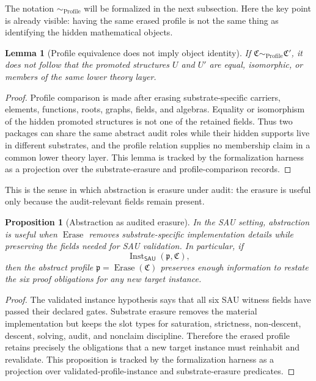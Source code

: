 \documentclass[11pt]{article}
\newcommand{\SAU}{\mathsf{SAU}}
\newcommand{\Prof}{\operatorname{Profile}}
\newcommand{\Inst}{\operatorname{Inst}}
\newcommand{\Erase}{\operatorname{Erase}}
\newtheorem{lemma}[theorem]{Lemma}
\newtheorem{proposition}[theorem]{Proposition}
\theoremstyle{definition}
\begin{document}
The notation \(\sim_{\Prof}\) will be formalized in the next subsection.  Here
the key point is already visible: having the same erased profile is not the same
thing as identifying the hidden mathematical objects.

\begin{lemma}[Profile equivalence does not imply object identity]
\label{lem:sau-profile-not-object-identity}
If \(\mathfrak C\sim_{\Prof}\mathfrak C'\), it does not follow that the promoted structures \(U\) and \(U'\) are equal, isomorphic, or members of the same lower theory layer.
\end{lemma}

\begin{proof}
Profile comparison is made after erasing substrate-specific carriers, elements,
functions, roots, graphs, fields, and algebras.  Equality or isomorphism of the
hidden promoted structures is not one of the retained fields.  Thus two packages
can share the same abstract audit roles while their hidden supports live in
different substrates, and the profile relation supplies no membership claim in a
common lower theory layer.  This lemma is tracked by the formalization harness
as a projection over the substrate-erasure and profile-comparison records.
\end{proof}

This is the sense in which abstraction is erasure under audit: the erasure is
useful only because the audit-relevant fields remain present.

\begin{proposition}[Abstraction as audited erasure]
\label{prop:sau-abstraction-as-erasure}
In the SAU setting, abstraction is useful when \(\Erase\) removes substrate-specific implementation details while preserving the fields needed for SAU validation.  In particular, if
\[
\Inst_{\SAU}(\mathfrak p,\mathfrak C),
\]
then the abstract profile \(\mathfrak p=\Erase(\mathfrak C)\) preserves enough information to restate the six proof obligations for any new target instance.
\end{proposition}

\begin{proof}
The validated instance hypothesis says that all six SAU witness fields have
passed their declared gates.  Substrate erasure removes the material
implementation but keeps the slot types for saturation, strictness, non-descent,
descent, solving, audit, and nonclaim discipline.  Therefore the erased profile
retains precisely the obligations that a new target instance must reinhabit and
revalidate.  This proposition is tracked by the formalization harness as a
projection over validated-profile-instance and substrate-erasure predicates.
\end{proof}
\end{document}
